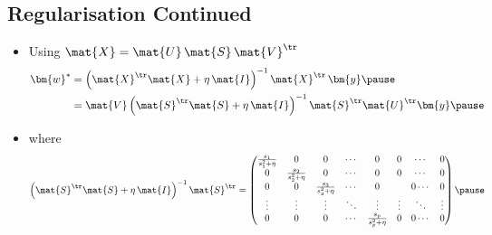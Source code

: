 
\begin{slide}
  \section[-1]{Regularisation Continued}

\begin{PauseHighLight}
  \begin{itemize}
  \item Using $\mat{X} = \mat{U}\,\mat{S}\,\mat{V}^\tr$
    \begin{align*}
      \bm{w}^*
      &= \left(\mat{X}^\tr \mat{X} + \eta \, \mat{I}
        \right)^{-1} \mat{X}^\tr \, \bm{y}\pause \\
      &= \mat{V} \left( \mat{S}^\tr\mat{S} +  \eta \, \mat{I} \right)^{-1}
        \mat{S}^\tr \mat{U}^\tr \bm{y}\pause
    \end{align*}
  \item where
    \begin{align*}
      \left( \mat{S}^\tr\mat{S} + \eta \,  \mat{I} \right)^{-1}
      \mat{S}^\tr =
      \begin{pmatrix}
        \frac{s_1}{s_1^2 + \eta} & 0 & 0 & \cdots & 0 & 0 & \cdots & 0 \\
          0 & \frac{s_2}{s_2^2 + \eta} & 0 & \cdots & 0 & 0 & \cdots & 0 \\
          0 & 0 & \frac{s_3}{s_3^2 + \eta} & \cdots & 0 & & 0 \cdots & 0 \\
        \vdots & \vdots & \vdots & \ddots & \vdots & \vdots & \ddots & \vdots \\
          0 & 0 & 0 & \cdots & \frac{s_p}{s_p^2 + \eta} & 0 & 0 \cdots & 0
       \end{pmatrix}\pause
    \end{align*}
  \end{itemize}
\end{PauseHighLight}

\end{slide}


